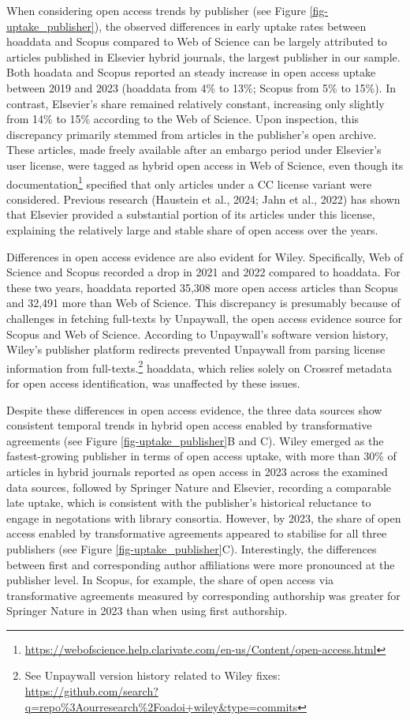 \documentclass[a4paper,man,floatsintext,longtable,noextraspace,10pt]{apa6}
\begin{document}
When considering open access trends by publisher (see Figure
\ref{fig-uptake_publisher}), the observed differences in early uptake
rates between hoaddata and Scopus compared to Web of Science can be
largely attributed to articles published in Elsevier hybrid journals,
the largest publisher in our sample. Both hoadata and Scopus reported an
steady increase in open access uptake between 2019 and 2023 (hoaddata
from 4\% to 13\%; Scopus from 5\% to 15\%). In contrast, Elsevier's
share remained relatively constant, increasing only slightly from 14\%
to 15\% according to the Web of Science. Upon inspection, this
discrepancy primarily stemmed from articles in the publisher's open
archive. These articles, made freely available after an embargo period
under Elsevier's user license, were tagged as hybrid open access in Web
of Science, even though its documentation\footnote{\url{https://webofscience.help.clarivate.com/en-us/Content/open-access.html}}
specified that only articles under a CC license variant were considered.
Previous research (Haustein et al., 2024; Jahn et al., 2022) has shown
that Elsevier provided a substantial portion of its articles under this
license, explaining the relatively large and stable share of open access
over the years.

Differences in open access evidence are also evident for Wiley.
Specifically, Web of Science and Scopus recorded a drop in 2021 and 2022
compared to hoaddata. For these two years, hoaddata reported 35,308 more
open access articles than Scopus and 32,491 more than Web of Science.
This discrepancy is presumably because of challenges in fetching
full-texts by Unpaywall, the open access evidence source for Scopus and
Web of Science. According to Unpaywall's software version history,
Wiley's publisher platform redirects prevented Unpaywall from parsing
license information from full-texts.\footnote{See Unpaywall version
  history related to Wiley fixes:
  \url{https://github.com/search?q=repo\%3Aourresearch\%2Foadoi+wiley&type=commits}}
hoaddata, which relies solely on Crossref metadata for open access
identification, was unaffected by these issues.

Despite these differences in open access evidence, the three data
sources show consistent temporal trends in hybrid open access enabled by
transformative agreements (see Figure \ref{fig-uptake_publisher}B and
C). Wiley emerged as the fastest-growing publisher in terms of open
access uptake, with more than 30\% of articles in hybrid journals
reported as open access in 2023 across the examined data sources,
followed by Springer Nature and Elsevier, recording a comparable late
uptake, which is consistent with the publisher's historical reluctance
to engage in negotations with library consortia. However, by 2023, the
share of open access enabled by transformative agreements appeared to
stabilise for all three publishers (see Figure
\ref{fig-uptake_publisher}C). Interestingly, the differences between
first and corresponding author affiliations were more pronounced at the
publisher level. In Scopus, for example, the share of open access via
transformative agreements measured by corresponding authorship was
greater for Springer Nature in 2023 than when using first authorship.
\end{document}
